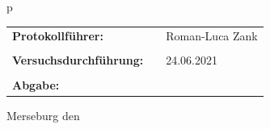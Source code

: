 \begin{center}
\begin{tabular}{p{\textwidth}}
\vspace*{12.5mm}

\begin{center}
\begin{tabular}{lll}
\large{\textbf{Protokollführer:}}&& \large{Roman-Luca Zank}\\
&&\\
\large{\textbf{Versuchsdurchführung:}}&& \large{24.06.2021}\\
&&\\
\large{\textbf{Abgabe:}}&& \large{\todayDE}\\
\end{tabular}
\end{center}

\end{tabular}
\end{center}
\vfill
\large{Merseburg den \todayDE}
